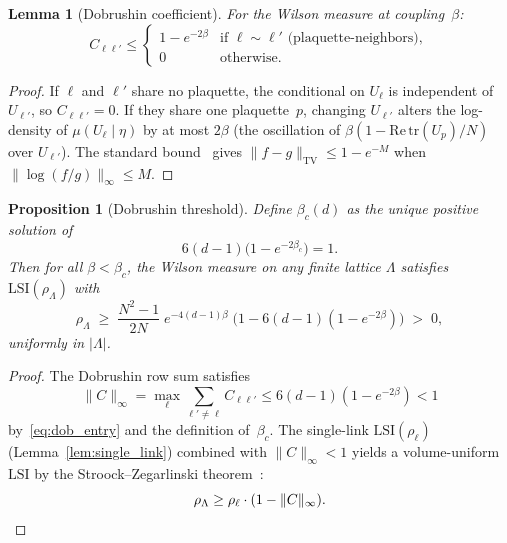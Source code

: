 \documentclass[11pt]{article}
\newtheorem{proposition}[theorem]{Proposition}
\newtheorem{lemma}[theorem]{Lemma}
\theoremstyle{definition}
\theoremstyle{remark}
\newcommand{\tr}{\mathrm{tr}}
\newcommand{\LSI}{\mathrm{LSI}}
\newcommand{\TV}{\mathrm{TV}}
\begin{document}
\begin{lemma}[Dobrushin coefficient]\label{lem:dob_coeff}
For the Wilson measure at coupling~$\beta$:
\begin{equation}\label{eq:dob_entry}
  C_{\ell\ell'} \leq 
  \begin{cases}
    1 - e^{-2\beta} & \text{if } \ell \sim \ell' 
    \text{ (plaquette-neighbors)}, \\
    0 & \text{otherwise}.
  \end{cases}
\end{equation}
\end{lemma}

\begin{proof}
If $\ell$ and $\ell'$ share no plaquette, the conditional on 
$U_\ell$ is independent of $U_{\ell'}$, so $C_{\ell\ell'} = 0$.  
If they share one plaquette~$p$, changing $U_{\ell'}$ alters the 
log-density of $\mu(U_\ell \mid \eta)$ by at most $2\beta$ 
(the oscillation of $\beta(1-\mathrm{Re}\,\tr(U_p)/N)$ over 
$U_{\ell'}$).  The standard bound~\cite[Lemma~8.6]{martinelli_lectures} 
gives $\|f - g\|_{\TV} \leq 1 - e^{-M}$ when 
$\|\log(f/g)\|_\infty \leq M$.
\end{proof}

\begin{proposition}[Dobrushin threshold]\label{prop:threshold}
Define $\beta_c(d)$ as the unique positive solution of
\begin{equation}\label{eq:threshold}
  6(d-1)\bigl(1 - e^{-2\beta_c}\bigr) = 1.
\end{equation}
Then for all $\beta < \beta_c$, the Wilson measure on any finite 
lattice $\Lambda$ satisfies $\LSI(\rho_\Lambda)$ with
\begin{equation}\label{eq:global_gap}
  \rho_\Lambda \;\geq\; 
  \frac{N^2-1}{2N}\;e^{-4(d-1)\beta}\;
  \bigl(1 - 6(d-1)(1-e^{-2\beta})\bigr) \;>\; 0,
\end{equation}
uniformly in $|\Lambda|$.
\end{proposition}

\begin{proof}
The Dobrushin row sum satisfies
\[
  \|C\|_\infty = \max_\ell \sum_{\ell' \neq \ell} C_{\ell\ell'} 
  \leq 6(d-1)(1-e^{-2\beta}) < 1
\]
by~\eqref{eq:dob_entry} and the definition of~$\beta_c$.  
The single-link $\LSI(\rho_\ell)$ 
(Lemma~\ref{lem:single_link}) combined with $\|C\|_\infty < 1$ 
yields a volume-uniform $\LSI$ by the Stroock--Zegarlinski 
theorem~\cite[Thm.~3.5]{SZ92}:
\[
  \rho_\Lambda \geq \rho_\ell \cdot (1 - \|C\|_\infty).
  \qedhere
\]
\end{proof}
\end{document}
